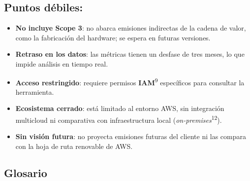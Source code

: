 \documentclass[12pt,a4paper]{report}
\begin{document}
\subsection*{Puntos débiles:}

\begin{itemize}
  \item \textbf{No incluye Scope 3}: no abarca emisiones indirectas de la cadena de valor, como la fabricación del hardware; se espera en futuras versiones.
  \item \textbf{Retraso en los datos}: las métricas tienen un desfase de tres meses, lo que impide análisis en tiempo real.
  \item \textbf{Acceso restringido}: requiere permisos \textbf{IAM}\textsuperscript{9} específicos para consultar la herramienta.
  \item \textbf{Ecosistema cerrado}: está limitado al entorno AWS, sin integración multicloud ni comparativa con infraestructura local (\textit{on-premises}\textsuperscript{12}).
  \item \textbf{Sin visión futura}: no proyecta emisiones futuras del cliente ni las compara con la hoja de ruta renovable de AWS.
\end{itemize}

\subsection*{Glosario}
\end{document}

